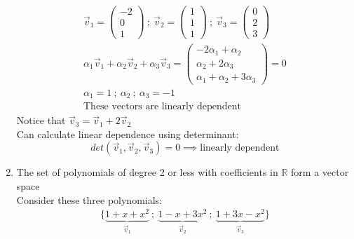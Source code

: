 \documentclass[a4paper, 11pt, normalem]{report}
\newcommand\R{\mathbb{R}}
\begin{document}
\begin{enumerate}
\begin{gather*}
                \vec{v}_{1} =
                \begin{pmatrix}
                    -2 \\
                    0  \\
                    1
                \end{pmatrix} ~;~
                \vec{v}_{2} =
                \begin{pmatrix}
                    1 \\
                    1 \\
                    1
                \end{pmatrix} ~;~
                \vec{v}_{3} =
                \begin{pmatrix}
                    0 \\
                    2 \\
                    3
                \end{pmatrix} \\
                \alpha_{1}\vec{v}_{1} + \alpha_{2}\vec{v}_{2} + \alpha_{3}\vec{v}_{3} =
                \begin{pmatrix}
                    -2\alpha_{1} + \alpha_{2} \\
                    \alpha_{2} + 2\alpha_{3}  \\
                    \alpha_{1} + \alpha_{2} + 3\alpha_{3}
                \end{pmatrix} = 0 \\
                \alpha_{1} = 1 ~;~ \alpha_{2} ~;~ \alpha_{3} = -1 \\
                \text{These vectors are linearly dependent}
            \end{gather*}
            Notice that $\vec{v}_{3} = \vec{v}_{1} + 2\vec{v}_{2}$ \\
            Can calculate linear dependence using determinant:
            \begin{equation*}
                det(\vec{v}_{1},\vec{v}_{2},\vec{v}_{3}) = 0 \implies \text{linearly dependent}
            \end{equation*}
    \item   The set of polynomials of degree 2 or less with coefficients in $\R$ form a vector space \\
    Consider these three polynomials:
            \begin{gather*}
                \Bigg\{\underbrace{1 + x + x^2}_{\vec{v}_1} ~;~ \underbrace{1 - x + 3x^2}_{\vec{v}_2} ~;~ \underbrace{1 + 3x - x^2}_{\vec{v}_3} \Bigg\} \\

\end{gather*}
\end{enumerate}
\end{document}
